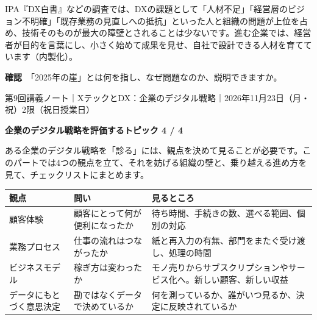 \documentclass[paper=a4paper,fontsize=10pt,line_length=170mm,number_of_lines=46,baselineskip=1.6zw]{jlreq}
\newcommand\topichead[4]{%
  {\sffamily\footnotesize\color{grayt}#1\par}\vspace{1.5mm}
  {\sffamily\bfseries\LARGE #4}\hfill\colorbox{accent}{\sffamily\footnotesize\bfseries トピック #2 / #3}\par
  \vspace{1.2mm}{\color{ink}\hrule height 0.6pt}\vspace{3mm}}
\newcommand\subhead[1]{\par\vspace{2.6mm}{\sffamily\bfseries\large #1}\par\vspace{1.3mm}}
\begin{document}
\subhead{進む企業と進まない企業を分けるもの}
IPA『DX白書』などの調査では、DXの課題として「人材不足」「経営層のビジョン不明確」「既存業務の見直しへの抵抗」といった人と組織の問題が上位を占め、技術そのものが最大の障壁とされることは少ないです。進む企業では、経営者が目的を言葉にし、小さく始めて成果を見せ、自社で設計できる人材を育てています（内製化）。\par\vspace{1.2mm}
\begin{checkbox}
{\sffamily\bfseries 確認}　「2025年の崖」とは何を指し、なぜ問題なのか、説明できますか。\par
\end{checkbox}
\clearpage
\topichead{第9回講義ノート｜XテックとDX：企業のデジタル戦略｜2026年11月23日（月・祝）2限（祝日授業日）}{4}{4}{企業のデジタル戦略を評価する}
ある企業のデジタル戦略を「診る」には、観点を決めて見ることが必要です。このパートでは4つの観点を立て、それを妨げる組織の壁と、乗り越える進め方を見て、チェックリストにまとめます。\par\vspace{1.2mm}
\subhead{4つの観点}
\begin{center}\small\renewcommand{\arraystretch}{1.15}\setlength{\tabcolsep}{1.5mm}
\begin{tabular}{|p{24.0mm}|p{68.0mm}|p{68.0mm}|}\arrayrulecolor{rulec}\hline
\rowcolor{papertwo}\sffamily\bfseries 観点 & \sffamily\bfseries 問い & \sffamily\bfseries 見るところ\\\hline
顧客体験 & 顧客にとって何が便利になったか & 待ち時間、手続きの数、選べる範囲、個別の対応\\\hline
業務プロセス & 仕事の流れはつながったか & 紙と再入力の有無、部門をまたぐ受け渡し、処理の時間\\\hline
ビジネスモデル & 稼ぎ方は変わったか & モノ売りからサブスクリプションやサービス化へ。新しい顧客、新しい収益\\\hline
データにもとづく意思決定 & 勘ではなくデータで決めているか & 何を測っているか、誰がいつ見るか、決定に反映されているか\\\hline
\end{tabular}\end{center}\vspace{0.5mm}
\subhead{ビジネスモデルの変化}
\end{document}
